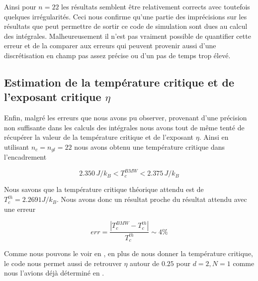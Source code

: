 \documentclass[10.5pt]{article}
\begin{document}
\begin{multicols}{2}
Ainsi pour $n=22$ les résultats semblent être relativement corrects avec toutefois quelques irrégularités. Ceci nous confirme qu'une partie des imprécisions sur les résultats que peut permettre de sortir ce code de simulation sont dues au calcul des intégrales. Malheureusement il n'est pas vraiment possible de quantifier cette erreur et de la comparer aux erreurs qui peuvent provenir aussi d'une discrétisation en champ pas assez précise ou d'un pas de temps trop élevé. \\



\subsection{Estimation de la température critique et de l'exposant critique $\eta$}

Enfin, malgré les erreurs que nous avons pu observer, provenant d'une précision non suffisante dans les calculs des intégrales nous avons tout de même tenté de récupérer la valeur de la température critique et de l'exposant $\eta$. Ainsi en utilisant $n_c = n_{gl} = 22$ nous avons obtenu une température critique dans l'encadrement

\begin{equation}
2.350 \, J/k_B < T_c^{BMW}  < 2.375 \, J/k_B
\end{equation}

Nous savons que la température critique théorique attendu est de $T_c^{th} = 2.2691 J/k_B$. Nous avons donc un résultat proche du résultat attendu avec une erreur 

\begin{equation}
	err = \frac{ |T_c^{BMW} - T_c^{th}|}{T_c^{th}} \sim 4 \%
\end{equation}


Comme nous pouvons le voir en , en plus de nous donner la température critique, le code nous permet aussi de retrouver $\eta$ autour de $0.25$ pour $d=2, N=1$ comme nous l'avions déjà déterminé en .


\end{multicols}
\end{document}
